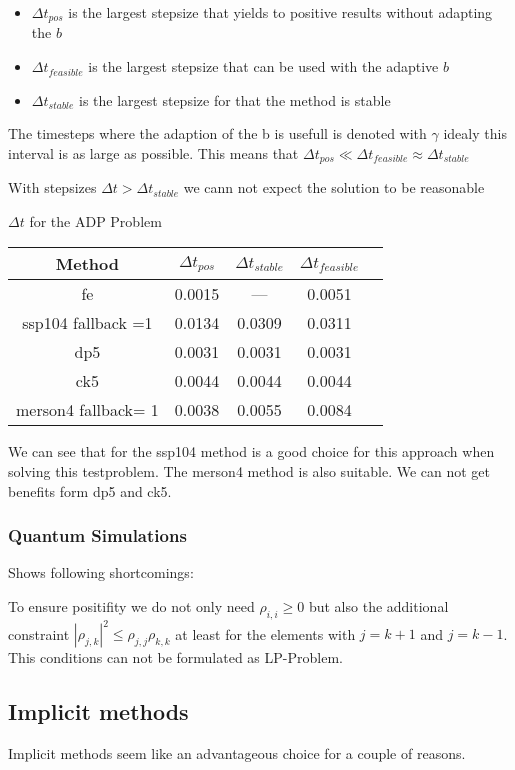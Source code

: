 \documentclass{article}
\begin{document}
\begin{itemize}
\item
$\Delta t_{pos}$ is the largest stepsize that yields to positive results without adapting the $b$

\item
$\Delta t_{feasible}$ is the largest stepsize that can be used with the adaptive $b$

\item
$\Delta t_{stable}$ is the largest stepsize for that the method is stable
\end{itemize}


The timesteps where the adaption of the b is usefull is denoted with $\gamma$ idealy this interval is as large as possible. This means that $\Delta t_{pos} \ll \Delta t_{feasible} \approx \Delta t_{stable}$

With stepsizes $\Delta t > \Delta t_{stable} $ we cann not expect the solution to be reasonable

$\Delta t$ for the ADP Problem 

\begin{tabular}{|c|c|c|c|c|}
\hline 
Method & $\Delta t_{pos}$ &$\Delta t_{stable}$& $\Delta t_{feasible}$  \\ 
\hline
fe & 0.0015 & --- &  0.0051 \\
\hline 
ssp104 fallback =1 & 0.0134 & 0.0309 & 0.0311 \\ 
\hline 
dp5 &0.0031 &0.0031 & 0.0031\\ 
\hline 
ck5 & 0.0044&  0.0044 & 0.0044\\ 
\hline 
merson4 fallback= 1& 0.0038& 0.0055 & 0.0084\\
\hline
\end{tabular} 

We can see that for the ssp104 method is a good choice for this approach when solving this testproblem.  The merson4 method is also suitable. We can not get benefits form dp5 and ck5.


\subsubsection{Quantum Simulations}
Shows following shortcomings:

To ensure positifity we do not only need $\rho_{i,i} \geq 0$ but also the additional constraint $|\rho_{j,k}|^2 \leq \rho_{j,j} \rho_{k,k}$ at least for the elements with $j = k +1$ and $j = k-1$. This conditions can not be formulated as LP-Problem.

\subsection{Implicit methods}
Implicit methods seem like an advantageous choice for a couple of reasons.
\end{document}
